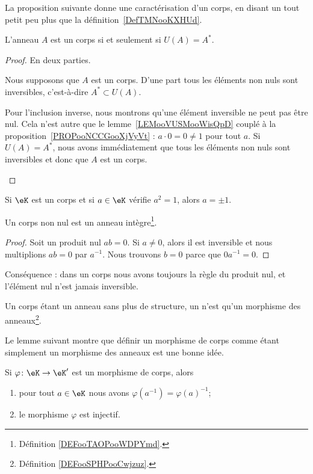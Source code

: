La proposition suivante donne une caractérisation d'un corps, en disant un tout petit peu plus que la définition~\ref{DefTMNooKXHUd}.
\begin{proposition}
	L'anneau \( A\) est un corps si et seulement si \( U(A) = A^* \).
\end{proposition}

\begin{proof}
	En deux parties.
	\begin{subproof}
		Nous supposons que \( A\) est un corps. D'une part tous les éléments non nuls sont inversibles, c'est-à-dire \( A^*\subset U(A)\).

		Pour l'inclusion inverse, nous montrons qu'une élément inversible ne peut pas être nul. Cela n'est autre que le lemme~\ref{LEMooVUSMooWisQpD} couplé à la proposition~\ref{PROPooNCCGooXjVyVt} : \( a\cdot 0=0\neq 1\) pour tout \( a\).
		Si \( U(A)=A^*\), nous avons immédiatement que tous les éléments non nuls sont inversibles et donc que \( A\) est un corps.
	\end{subproof}
\end{proof}

\begin{lemma}       \label{LEMooJNIBooAURhrt}
	Si \( \eK\) est un corps et si \( a\in \eK\) vérifie \( a^2=1\), alors \( a=\pm 1\).
\end{lemma}

\begin{lemma}       \label{LemAnnCorpsnonInterdivzer}
	Un corps non nul est un anneau intègre\footnote{Définition \ref{DEFooTAOPooWDPYmd}.}.
\end{lemma}

\begin{proof}
	Soit un produit nul \( ab=0\). Si \( a\neq 0\), alors il est inversible et nous multiplions \( ab=0\) par \( a^{-1}\). Nous trouvons \( b=0\) parce que \( 0a^{-1}=0\).
\end{proof}
Conséquence : dans un corps nous avons toujours la règle du produit nul, et l'élément nul n'est jamais inversible.

\begin{definition}
	Un corps étant un anneau sans plus de structure, un  n'est qu'un morphisme des anneaux\footnote{Définition \ref{DEFooSPHPooCwjzuz}.}.
\end{definition}

Le lemme suivant montre que définir un morphisme de corps comme étant simplement un morphisme des anneaux est une bonne idée.
\begin{lemma}       \label{LEMooWBOPooZnsZgQ}
	Si \( \varphi\colon \eK\to \eK'\) est un morphisme de corps, alors
	\begin{enumerate}
		\item
		      pour tout \( a\in \eK\) nous avons \( \varphi(a^{-1})=\varphi(a)^{-1}\);
		\item
		      le morphisme \( \varphi\) est injectif.
	\end{enumerate}
\end{lemma}

